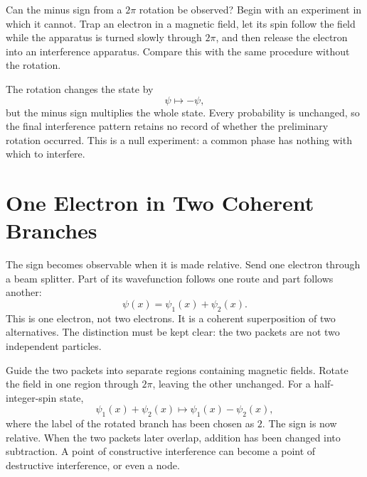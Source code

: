 Can the minus sign from a \(2\pi\) rotation be observed? Begin with an experiment in which it cannot. Trap an electron in a magnetic field, let its spin follow the field while the apparatus is turned slowly through \(2\pi\), and then release the electron into an interference apparatus. Compare this with the same procedure without the rotation.

The rotation changes the state by
\begin{equation}
\psi\longmapsto-\psi,
\end{equation}
but the minus sign multiplies the whole state. Every probability is unchanged, so the final interference pattern retains no record of whether the preliminary rotation occurred. This is a null experiment: a common phase has nothing with which to interfere.

\begin{classroomqa}
\end{classroomqa}

\section{One Electron in Two Coherent Branches}

The sign becomes observable when it is made relative. Send one electron through a beam splitter. Part of its wavefunction follows one route and part follows another:
\begin{equation}
\psi(x)=\psi_1(x)+\psi_2(x).
\end{equation}
This is one electron, not two electrons. It is a coherent superposition of two alternatives. The distinction must be kept clear: the two packets are not two independent particles.

Guide the two packets into separate regions containing magnetic fields. Rotate the field in one region through \(2\pi\), leaving the other unchanged. For a half-integer-spin state,
\begin{equation}
\psi_1(x)+\psi_2(x)
\longmapsto
\psi_1(x)-\psi_2(x),
\end{equation}
where the label of the rotated branch has been chosen as \(2\). The sign is now relative. When the two packets later overlap, addition has been changed into subtraction. A point of constructive interference can become a point of destructive interference, or even a node.


